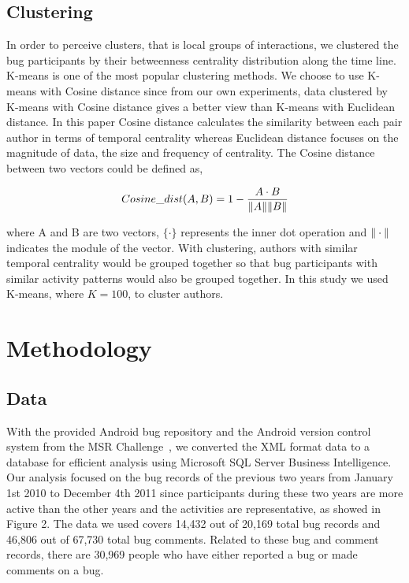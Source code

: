 \documentclass[conference]{IEEEtran}
\begin{document}
\subsection{Clustering}

In order to perceive clusters, that is local groups of interactions,
we clustered the bug participants by their betweenness centrality
distribution along the time line. 
K-means is one of the most popular
clustering methods. 
We choose to use K-means with Cosine distance
since from our own experiments, data clustered by K-means with Cosine
distance gives a better view than K-means with Euclidean
distance. 
In this paper Cosine distance calculates the similarity between each pair
author in terms of temporal centrality whereas Euclidean distance
focuses on the magnitude of data, the size and frequency of centrality.
The
Cosine distance between two vectors could be defined as,


\begin{equation}
Cosine\_dist(A,B) = 1-\frac{A\cdot B}{\Arrowvert A \Arrowvert \Arrowvert B \Arrowvert}
\end{equation}

where A and B are two vectors, $\{\cdot\}$ represents the inner dot
operation and $\Arrowvert \cdot \Arrowvert$ indicates the module of
the vector. With clustering, authors with similar temporal centrality would be
grouped together so that bug participants with similar activity
patterns would also be grouped together.  In this study we used
K-means, where $K =
100$, to cluster authors.


\section{Methodology}
\label{methodology}
\subsection{Data}

With the provided Android bug repository and the Android version
control system
from the MSR Challenge~\cite{DATA:msr}, we converted the XML format data to
a database for efficient analysis using Microsoft SQL Server Business
Intelligence. Our analysis focused on the bug records of the previous
two years from January 1st 2010 to December 4th 2011 since participants
during these two years are more active than the other years and the
activities are representative, as showed in Figure 2. The data we used
covers 14,432 out of 20,169 total bug records and 46,806 out of 67,730
total bug comments. Related to these bug and comment records, there
are 30,969 people who have either reported a bug or made comments on a
bug.
\end{document}
